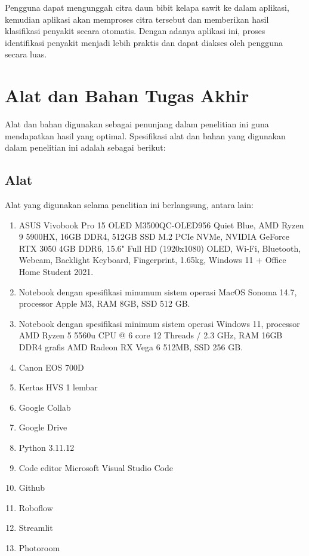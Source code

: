 Pengguna dapat mengunggah citra daun bibit kelapa sawit ke dalam aplikasi, kemudian aplikasi akan memproses citra tersebut dan memberikan hasil klasifikasi penyakit secara otomatis. Dengan adanya aplikasi ini, proses identifikasi penyakit menjadi lebih praktis dan dapat diakses oleh pengguna secara luas.

\section{Alat dan Bahan Tugas Akhir} \label{III.Alat dan Bahan}
Alat dan bahan digunakan sebagai penunjang dalam penelitian ini guna mendapatkan hasil yang optimal. Spesifikasi alat dan bahan yang digunakan dalam penelitian ini adalah sebagai berikut: \par

\subsection{Alat} \label{III.Alat}
Alat yang digunakan selama penelitian ini berlangsung, antara lain: \par
\begin{enumerate}[noitemsep]
	\item ASUS Vivobook Pro 15 OLED M3500QC-OLED956 Quiet Blue, AMD Ryzen 9 5900HX, 16GB DDR4, 512GB SSD M.2 PCIe NVMe, NVIDIA GeForce RTX 3050 4GB DDR6, 15.6" Full HD (1920x1080) OLED, Wi-Fi, Bluetooth, Webcam, Backlight Keyboard, Fingerprint, 1.65kg, Windows 11 + Office Home Student 2021.
	\item Notebook dengan spesifikasi minumum sistem operasi MacOS Sonoma 14.7, processor Apple M3, RAM 8GB, SSD 512 GB.
	\item Notebook dengan spesifikasi minimum sistem operasi Windows 11, processor AMD Ryzen 5 5560u CPU @ 6 core 12 Threads / 2.3 GHz, RAM 16GB DDR4 grafis AMD Radeon RX Vega 6 512MB, SSD 256 GB.
	\item Canon EOS 700D
	\item Kertas HVS 1 lembar
	\item Google Collab
	\item Google Drive
	\item Python 3.11.12
	\item Code editor Microsoft Visual Studio Code
	\item Github
	\item Roboflow 
	\item Streamlit
	\item Photoroom
\end{enumerate}

